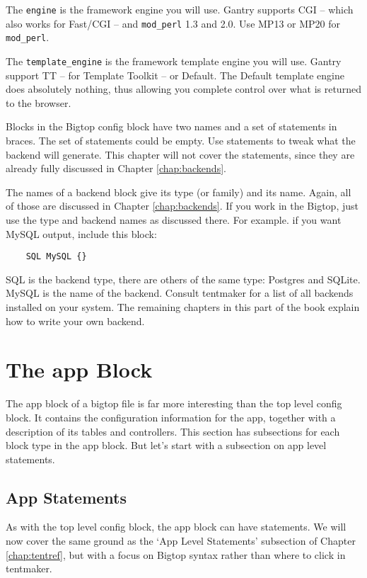 The \verb+engine+ is the framework engine you will use.  Gantry supports
CGI -- which also works for Fast/CGI -- and \verb+mod_perl+ 1.3 and 2.0.
Use MP13 or MP20 for \verb+mod_perl+.

The \verb+template_engine+ is the framework template engine you will use.
Gantry support TT -- for Template Toolkit -- or Default.  The Default
template engine does absolutely nothing, thus allowing you complete control
over what is returned to the browser.

Blocks in the Bigtop config block have two names and a set of statements
in braces.  The set of statements could be empty.  Use statements to tweak
what the backend will generate.  This chapter will not cover the statements,
since they are already fully discussed in Chapter \ref{chap:backends}.

The names of a backend block give its type (or family) and its name.
Again, all of those are discussed in Chapter \ref{chap:backends}.
If you work in the Bigtop, just use the type and backend names
as discussed there.  For example. if you want MySQL output, include
this block:

\begin{verbatim}
    SQL MySQL {}
\end{verbatim}

SQL is the backend type, there are others of the same type: Postgres and
SQLite.  MySQL is the name of the backend.  Consult tentmaker for a list
of all backends installed on your system.  The remaining chapters in this
part of the book explain how to write your own backend.

\section{The app Block }

The app block of a bigtop file is far more interesting than the top level
config block.  It contains the configuration information for the app,
together with a description of its tables and controllers.  This section
has subsections for each block type in the app block.  But let's start
with a subsection on app level statements.

\subsection*{App Statements}

As with the top level config block, the app block can have statements.
We will now cover the same ground as the `App Level Statements' subsection
of Chapter \ref{chap:tentref}, but with a focus on Bigtop syntax rather
than where to click in tentmaker.

